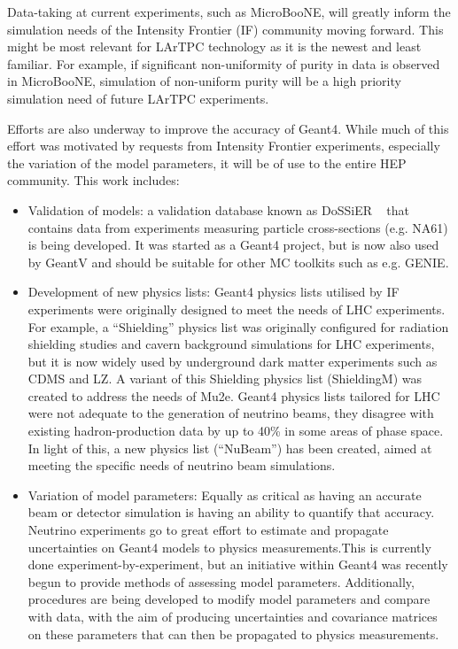 \documentclass[12pt,a4paper]{article}
\begin{document}
{Data-taking at current experiments, such as MicroBooNE, will greatly
inform the simulation needs of the Intensity Frontier (IF) community
moving forward. This might be most relevant for LArTPC technology as it
is the newest and least familiar. For example, if significant
non-uniformity of purity in data is observed in MicroBooNE, simulation
of non-uniform purity will be a high priority simulation need of future
LArTPC experiments.

Efforts are also underway to improve the accuracy of Geant4. While much
of this effort was motivated by requests from Intensity Frontier
experiments, especially the variation of the model parameters, it will
be of use to the entire HEP community. This work includes:

\begin{itemize}
\item
  Validation of models: a validation database known as DoSSiER ~\cite{Wenzel:2017dqo}
  that contains data from experiments measuring particle cross-sections
  (e.g. NA61) is being developed. It was started as a Geant4 project,
  but is now also used by GeantV and should be suitable for other MC
  toolkits such as e.g. GENIE.
\item
  Development of new physics lists: Geant4 physics lists utilised by IF
  experiments were originally designed to meet the needs of LHC
  experiments. For example, a ``Shielding'' physics list was originally
  configured for radiation shielding studies and cavern background
  simulations for LHC experiments, but it is now widely used by
  underground dark matter experiments such as CDMS and LZ. A variant of
  this Shielding physics list (ShieldingM) was created to address the
  needs of Mu2e. Geant4 physics lists tailored for LHC were not adequate
  to the generation of neutrino beams, they disagree with existing
  hadron-production data by up to 40\% in some areas of phase space. In
  light of this, a new physics list (``NuBeam'') has been created, aimed
  at meeting the specific needs of neutrino beam simulations.
\item
  Variation of model parameters: Equally as critical as having an
  accurate beam or detector simulation is having an ability to quantify
  that accuracy. Neutrino experiments go to great effort to estimate and
  propagate uncertainties on Geant4 models to physics measurements.This
  is currently done experiment-by-experiment, but an initiative within
  Geant4 was recently begun to provide methods of assessing model
  parameters. Additionally, procedures are being developed to modify
  model parameters and compare with data, with the aim of producing
  uncertainties and covariance matrices on these parameters that can
  then be propagated to physics measurements.
\end{itemize}

}
\end{document}
